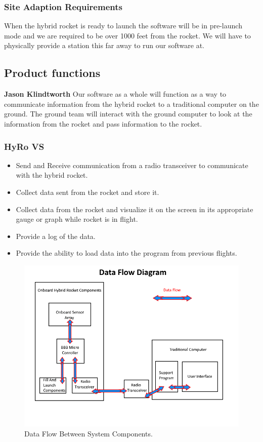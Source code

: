\documentclass[10pt,draftclsnofoot,onecolumn,compsoc]{IEEEtran}
\begin{document}
\subsubsection{Site Adaption Requirements}
When the hybrid rocket is ready to launch the software will be in pre-launch mode and we are required to be over 1000 feet from the rocket. We will have to physically provide a station this far away to run our software at.

\subsection{ Product functions}
{\bf Jason Klindtworth}
Our software as a whole will function as a way to communicate information from the hybrid rocket to a traditional computer on the ground. The ground team will interact with the ground computer to look at the information from the rocket and pass information to the rocket.

\subsubsection{HyRo VS}
\begin{itemize}
\item Send and Receive communication from a radio transceiver to communicate with the hybrid rocket.
\item Collect data sent from the rocket and store it.
\item Collect data from the rocket and visualize it on the screen in its appropriate gauge or graph while rocket is in flight.
\item Provide a log of the data.
\item Provide the ability to load data into the program from previous flights.
\end{itemize}

\begin{figure}[!ht]
  \caption{Data Flow Between System Components.}
  \centering
	\includegraphics[scale=.85]{RocketBlockDiagram}
\end{figure}
\FloatBarrier
\end{document}
